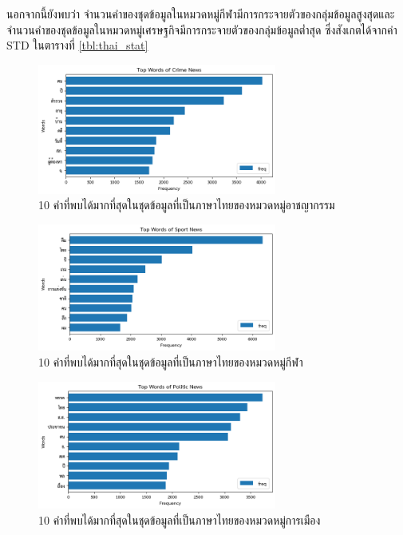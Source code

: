 \documentclass[12pt,oneside,openright,a4paper]{cpe-thai-project}
\begin{document}
\begin{itemize}
        นอกจากนี้ยังพบว่า จำนวนคำของชุดข้อมูลในหมวดหมู่กีฬามีการกระจายตัวของกลุ่มข้อมูลสูงสุดและจำนวนคำของชุดข้อมูลในหมวดหมู่เศรษฐกิจมีการกระจายตัวของกลุ่มข้อมูลต่ำสุด
        ซึ่งสังเกตได้จากค่า STD ในตารางที่ \ref{tbl:thai_stat}
        \newpage
        \begin{figure}[!ht]\centering
          \includegraphics[width=0.7\textwidth]{./img/thai_stat/crime_bar.png}
          \caption{10 คำที่พบได้มากที่สุดในชุดข้อมูลที่เป็นภาษาไทยของหมวดหมู่อาชญากรรม}\label{fig:crime_bar_th}
        \end{figure}
        \begin{figure}[!ht]\centering
          \includegraphics[width=0.7\textwidth]{./img/thai_stat/sport_bar.png}
          \caption{10 คำที่พบได้มากที่สุดในชุดข้อมูลที่เป็นภาษาไทยของหมวดหมู่กีฬา}\label{fig:sport_bar_th}
        \end{figure}
        \begin{figure}[!ht]\centering
          \includegraphics[width=0.7\textwidth]{./img/thai_stat/polit_bar.png}
          \caption{10 คำที่พบได้มากที่สุดในชุดข้อมูลที่เป็นภาษาไทยของหมวดหมู่การเมือง}\label{fig:polit_bar_th}

\end{figure}
\end{itemize}
\end{document}
